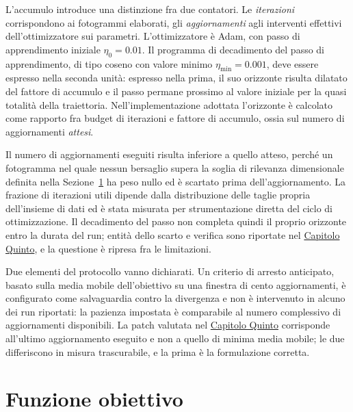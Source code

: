\ifstampa\documentclass[a4paper,12pt,twoside,openright]{report}\else\documentclass[a4paper,12pt]{report}\fi
\newif\ifrevisione \revisionefalse
\DeclareRobustCommand{\rev}[1]{\ifrevisione{\color{blue!65!black}#1}\else#1\fi}
\begin{document}
L'accumulo introduce una distinzione fra due contatori. Le \emph{iterazioni}
corrispondono ai fotogrammi elaborati, gli \emph{aggiornamenti} agli interventi
effettivi dell'ottimizzatore sui parametri. \rev{L'ottimizzatore è Adam, con passo di apprendimento iniziale
$\eta_0 = 0.01$.} Il programma di decadimento del
passo di apprendimento, di tipo coseno \rev{con valore minimo
$\eta_{\mathrm{min}} = 0.001$}, deve essere espresso nella seconda
unità: espresso nella prima, il suo orizzonte risulta dilatato del fattore di
accumulo e il passo permane prossimo al valore iniziale per la quasi totalità
della traiettoria. Nell'implementazione adottata l'orizzonte è calcolato come
rapporto fra budget di iterazioni e fattore di accumulo, ossia sul numero di
aggiornamenti \emph{attesi}.

Il numero di aggiornamenti eseguiti risulta inferiore a quello atteso, perché un
fotogramma nel quale nessun bersaglio supera la soglia di rilevanza dimensionale
definita nella Sezione~\ref{sec:loss} ha peso nullo ed è scartato prima
dell'aggiornamento. La frazione di iterazioni utili dipende dalla distribuzione
delle taglie propria dell'insieme di dati ed è stata misurata per strumentazione
diretta del ciclo di ottimizzazione. Il decadimento del passo non completa
quindi il proprio orizzonte entro la durata del run; entità dello scarto e
verifica sono riportate nel \hyperref[cap5]{Capitolo Quinto}, e la questione è ripresa fra le
limitazioni.

Due elementi del protocollo vanno dichiarati. Un criterio di arresto anticipato,
basato sulla media mobile dell'obiettivo su una finestra di cento aggiornamenti,
è configurato come salvaguardia contro la divergenza e non è intervenuto in
alcuno dei run riportati: la pazienza impostata è comparabile al numero
complessivo di aggiornamenti disponibili. La patch valutata nel \hyperref[cap5]{Capitolo Quinto} corrisponde all'ultimo aggiornamento eseguito e non a quello di
minima media mobile; le due differiscono in misura trascurabile, e la prima è la
formulazione corretta.

\section{Funzione obiettivo}
\label{sec:loss}
\end{document}
